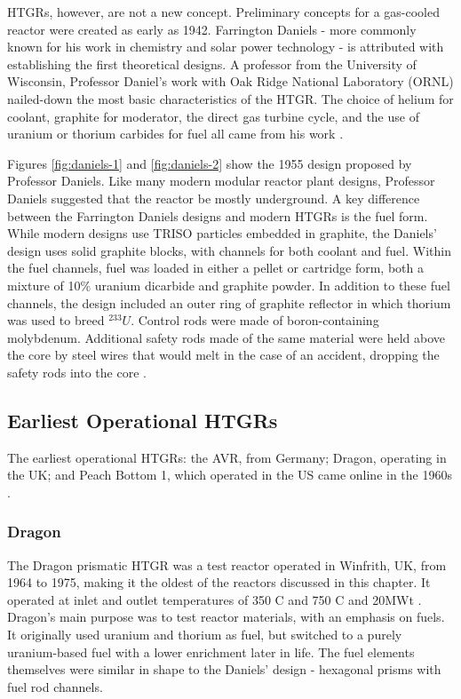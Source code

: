 HTGRs, however, are not a new concept.  Preliminary concepts for a gas-cooled reactor were created as early as 1942.  Farrington Daniels - more commonly known for his work in chemistry and solar power technology - is attributed with establishing the first theoretical designs.  A professor from the University of Wisconsin, Professor Daniel's work with Oak Ridge National Laboratory (ORNL) nailed-down the most basic characteristics of the HTGR.  The choice of helium for coolant, graphite for moderator, the direct gas turbine cycle, and the use of uranium or thorium carbides for fuel all came from his work \cite{simnad_early_1991}.




Figures \ref{fig:daniels-1} and \ref{fig:daniels-2} show the 1955 design proposed by Professor Daniels.  Like many modern modular reactor plant designs, Professor Daniels suggested that the reactor be mostly underground.  A key difference between the Farrington Daniels designs and modern HTGRs is the fuel form.  While modern designs use TRISO particles embedded in graphite, the Daniels' design uses solid graphite blocks, with channels for both coolant and fuel.  Within the fuel channels, fuel was loaded in either a pellet or cartridge form, both a mixture of 10$\%$ uranium dicarbide and graphite powder.  In addition to these fuel channels, the design included an outer ring of graphite reflector in which thorium was used to breed $^{233}U$.  Control rods were made of boron-containing molybdenum.  Additional safety rods made of the same material were held above the core by steel wires that would melt in the case of an accident, dropping the safety rods into the core \cite{simnad_early_1991}.

\subsection{Earliest Operational HTGRs}

The earliest operational HTGRs: the AVR, from Germany; Dragon, operating in the UK; and Peach Bottom 1, which operated in the US came online in the 1960s \cite{beck_high_nodate}.

\subsubsection{Dragon}

The Dragon prismatic HTGR was a test reactor operated in Winfrith, UK, from 1964 to 1975, making it the oldest of the reactors discussed in this chapter.  It operated at inlet and outlet temperatures of 350 \textdegree C and 750 \textdegree C and 20MWt \cite{beck_high_nodate}.  Dragon's main purpose was to test reactor materials, with an emphasis on fuels.  It originally used uranium and thorium as fuel, but switched to a purely uranium-based fuel with a lower enrichment later in life.  The fuel elements themselves were similar in shape to the Daniels' design - hexagonal prisms with fuel rod channels.

